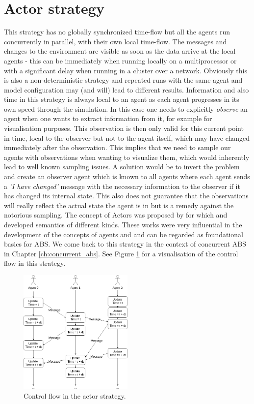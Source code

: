 \section{Actor strategy}
\label{sub:act_strategy}
This strategy has no globally synchronized time-flow but all the agents run concurrently in parallel, with their own local time-flow. The messages and changes to the environment are visible as soon as the data arrive at the local agents - this can be immediately when running locally on a multiprocessor or with a significant delay when running in a cluster over a network. Obviously this is also a non-deterministic strategy and repeated runs with the same agent and model configuration may (and will) lead to different results. Information and also time in this strategy is always local to an agent as each agent progresses in its own speed through the simulation. In this case one needs to explicitly \textit{observe} an agent when one wants to extract information from it, for example for visualisation purposes. This observation is then only valid for this current point in time, local to the observer but not to the agent itself, which may have changed immediately after the observation. This implies that we need to sample our agents with observations when wanting to visualize them, which would inherently lead to well known sampling issues. A solution would be to invert the problem and create an observer agent which is known to all agents where each agent sends a \textit{'I have changed'} message with the necessary information to the observer if it has changed its internal state. This also does not guarantee that the observations will really reflect the actual state the agent is in but is a remedy against the notorious sampling. The concept of Actors was proposed by \cite{hewitt_universal_1973} for which \cite{grief_semantics_1975} and \cite{clinger_foundations_1981} developed semantics of different kinds. These works were very influential in the development of the concepts of agents and and can be regarded as foundational basics for ABS. We come back to this strategy in the context of concurrent ABS in Chapter \ref{ch:concurrent_abs}. See Figure \ref{fig:strategy_act} for a visualisation of the control flow in this strategy.

\begin{figure}[H]
	\centering
	\includegraphics[width=0.5\textwidth, angle=0]{./fig/implabs/actor.png}
	\caption{Control flow in the actor strategy.}
	\label{fig:strategy_act}
\end{figure}

